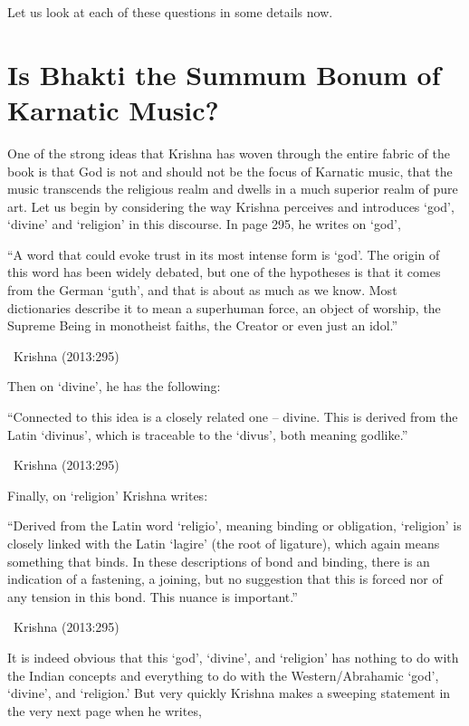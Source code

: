 Let us look at each of these questions in some details now.


\section*{Is Bhakti the Summum Bonum of Karnatic Music?}

One of the strong ideas that Krishna has woven through the entire fabric of the book is that God is not and should not be the focus of Karnatic music, that the music transcends the religious realm and dwells in a much superior realm of pure art. Let us begin by considering the way Krishna perceives and introduces ‘god’, ‘divine’ and ‘religion’ in this discourse. In page 295, he writes on ‘god’,

\begin{myquote}
“A word that could evoke trust in its most intense form is ‘god’. The origin of this word has been widely debated, but one of the hypotheses is that it comes from the German ‘guth’, and that is about as much as we know. Most dictionaries describe it to mean a superhuman force, an object of worship, the Supreme Being in monotheist faiths, the Creator or even just an idol.” 

~\hfill Krishna (2013:295)
\end{myquote}

Then on ‘divine’, he has the following:

\begin{myquote}
“Connected to this idea is a closely related one – divine. This is derived from the Latin ‘divinus’, which is traceable to the ‘divus’, both meaning godlike.” 

~\hfill Krishna (2013:295)
\end{myquote}

Finally, on ‘religion’ Krishna writes:

\begin{myquote}
“Derived from the Latin word ‘religio’, meaning binding or obligation, ‘religion’ is closely linked with the Latin ‘lagire’ (the root of ligature), which again means something that binds. In these descriptions of bond and binding, there is an indication of a fastening, a joining, but no suggestion that this is forced nor of any tension in this bond. This nuance is important.” 

~\hfill Krishna (2013:295)
\end{myquote}

\newpage

It is indeed obvious that this ‘god’, ‘divine’, and ‘religion’ has nothing to do with the Indian concepts and everything to do with the Western/Abrahamic ‘god’, ‘divine’, and ‘religion.’ But very quickly Krishna makes a sweeping statement in the very next page when he writes,

